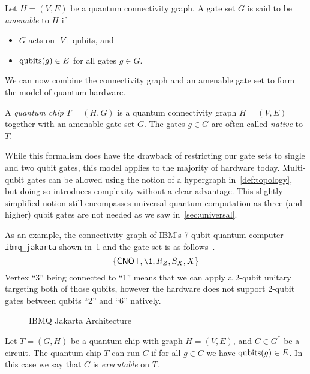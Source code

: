 \begin{definition}
    Let $H = (V, E)$ be a quantum connectivity graph.
    A gate set $G$ is said to be \emph{amenable} to $H$ if
    \begin{itemize}
        \item $G$ acts on $\abs{V}$ qubits, and
        \item $\operatorname{qubits}(g) \in E$ for all gates $g \in G$.
    \end{itemize}
\end{definition}
We can now combine the connectivity graph and an amenable gate set to form the model of quantum hardware.
\begin{definition}
    A \emph{quantum chip} $T = (H, G)$ is a quantum connectivity graph $H = (V, E)$ together with an amenable gate set $G$.
    The gates $g \in G$ are often called \emph{native} to $T$.
\end{definition}

While this formalism does have the drawback of restricting our gate sets to single and two qubit gates, this model applies to the majority of hardware today.
Multi-qubit gates can be allowed using the notion of a hypergraph in~\cref{def:topology}, but doing so introduces complexity without a clear advantage.
This slightly simplified notion still encompasses universal quantum computation as three (and higher) qubit gates are not needed as we saw in~\cref{sec:universal}.

As an example, the connectivity graph of IBM's 7-qubit quantum computer \texttt{ibmq\_jakarta} shown in~\cref{fig:ibm-jakarta} and the gate set is as follows~\cite{ibmq}.
\begin{equation} %
    \qty{\CNOT, \1, R_Z, S_X, X}
\end{equation}
Vertex ``3'' being connected to ``1'' means that we can apply a 2-qubit unitary targeting both of those qubits, however the hardware does not support 2-qubit gates between qubits ``2'' and ``6'' natively.
\begin{figure}[ht]
    \centering
    
    \caption{IBMQ Jakarta Architecture}\label{fig:ibm-jakarta}
\end{figure}

\begin{definition}
    Let $T = (G, H)$ be a quantum chip with graph $H = (V, E)$, and $C \in G^*$ be a circuit.
    The quantum chip $T$ can run $C$ if for all $g \in C$ we have $\operatorname{qubits}(g) \in E$.
    In this case we say that $C$ is \emph{executable} on $T$.
\end{definition}

